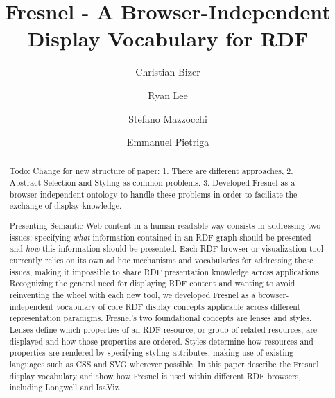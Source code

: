 \documentclass{llncs}
\begin{document}
%
\newcommand{\rdf}[1]{{\small \texttt{#1}}}

\frontmatter          %
%
\pagestyle{headings}  %
\mainmatter              %
%
\title{Fresnel - A Browser-Independent Display Vocabulary for RDF}
%
%
\author{Christian Bizer \and Ryan Lee \and Stefano Mazzocchi \and Emmanuel Pietriga}
%
%
%

\maketitle

\begin{abstract}
Todo: Change for new structure of paper: 1. There are different approaches, 2. Abstract Selection and Styling as common problems, 3. Developed Fresnel as a browser-independent ontology to handle these problems in order to faciliate the exchange of display knowledge.

Presenting Semantic Web content in a human-readable way consists in addressing two issues: specifying {\em what} information contained in an RDF graph should be presented and {\em how} this information should be presented. Each RDF browser or visualization tool currently relies on its own ad hoc mechanisms and vocabularies for addressing these issues, making it impossible to share RDF presentation knowledge across applications. Recognizing the general need for displaying RDF content and wanting to avoid reinventing the wheel with each new tool, we developed Fresnel as a browser-independent vocabulary of core RDF display concepts applicable across different representation paradigms. Fresnel's two foundational concepts are lenses and styles. Lenses define which properties of an RDF resource, or group of related resources, are displayed and how those properties are ordered. Styles determine how resources and properties are rendered by specifying styling attributes, making use of existing languages such as CSS and SVG wherever possible. In this paper describe the Fresnel display vocabulary and show how Fresnel is used within different RDF browsers, including Longwell and IsaViz.
\end{abstract}
\end{document}
